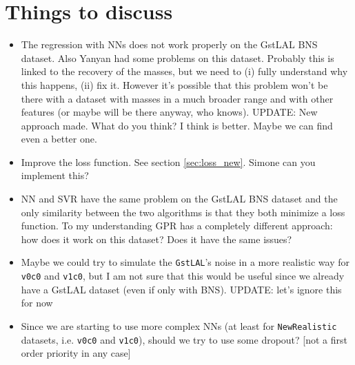 \documentclass[prd,aps,twocolumn,a4paper,showkeys,nofootinbib]{article}
\begin{document}
\section{Things to discuss}
\begin{itemize}
\item The regression with NNs does not work properly on the GstLAL BNS dataset.
Also Yanyan had some problems on this dataset. 
Probably this is linked to the recovery of the masses, 
but we need to (i) fully understand why this happens, (ii) fix it. 
However it's possible that this problem won't be there
with a dataset with masses in a much broader range 
and with other features (or maybe will be there anyway, who knows).  UPDATE: New approach made. What do you think? I think is better. Maybe we can find even a better one. 

\item Improve the loss function. See section \ref{sec:loss_new}. Simone can you implement this?

\item NN and SVR have the same problem on the GstLAL BNS dataset and the only 
similarity between the two algorithms is that they both minimize a loss function. 
To my understanding GPR has a completely different approach: how does it work on this dataset? 
Does it have the same issues? 

\item Maybe we could try to simulate the \texttt{GstLAL}'s noise in a more realistic way
for \texttt{v0c0} and \texttt{v1c0}, but I am not sure that this would be useful since 
we already have a GstLAL dataset (even if only with BNS). UPDATE: let's ignore this for now

\item Since we are starting to use more complex NNs (at least for \texttt{NewRealistic} 
datasets, i.e. \texttt{v0c0} and \texttt{v1c0}), should we try to use some dropout?
[not a first order priority in any case]
\end{itemize}

\end{document}

